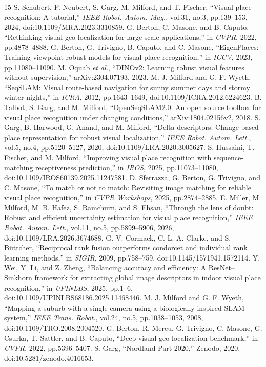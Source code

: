 \documentclass[conference]{IEEEtran}
\begin{document}
\begin{thebibliography}{15}
 S. Schubert, P. Neubert, S. Garg, M. Milford, and T. Fischer, ``Visual place recognition: A tutorial,'' \emph{IEEE Robot. Autom. Mag.}, vol.31, no.3, pp.139--153, 2024, doi:10.1109/MRA.2023.3310859.
 G. Berton, C. Masone, and B. Caputo, ``Rethinking visual geo-localization for large-scale applications,'' in \emph{CVPR}, 2022, pp.4878--4888.
 G. Berton, G. Trivigno, B. Caputo, and C. Masone, ``EigenPlaces: Training viewpoint robust models for visual place recognition,'' in \emph{ICCV}, 2023, pp.11080--11090.
 M. Oquab \emph{et al.}, ``DINOv2: Learning robust visual features without supervision,'' arXiv:2304.07193, 2023.
 M. J. Milford and G. F. Wyeth, ``SeqSLAM: Visual route-based navigation for sunny summer days and stormy winter nights,'' in \emph{ICRA}, 2012, pp.1643--1649, doi:10.1109/ICRA.2012.6224623.
 B. Talbot, S. Garg, and M. Milford, ``OpenSeqSLAM2.0: An open source toolbox for visual place recognition under changing conditions,'' arXiv:1804.02156v2, 2018.
 S. Garg, B. Harwood, G. Anand, and M. Milford, ``Delta descriptors: Change-based place representation for robust visual localization,'' \emph{IEEE Robot. Autom. Lett.}, vol.5, no.4, pp.5120--5127, 2020, doi:10.1109/LRA.2020.3005627.
 S. Hussaini, T. Fischer, and M. Milford, ``Improving visual place recognition with sequence-matching receptiveness prediction,'' in \emph{IROS}, 2025, pp.11073--11080, doi:10.1109/IROS60139.2025.11247581.
 D. Sferrazza, G. Berton, G. Trivigno, and C. Masone, ``To match or not to match: Revisiting image matching for reliable visual place recognition,'' in \emph{CVPR Workshops}, 2025, pp.2874--2885.
 E. Miller, M. Milford, M. B. Hafez, S. Ramchurn, and S. Ehsan, ``Through the lens of doubt: Robust and efficient uncertainty estimation for visual place recognition,'' \emph{IEEE Robot. Autom. Lett.}, vol.11, no.5, pp.5899--5906, 2026, doi:10.1109/LRA.2026.3674688.
 G. V. Cormack, C. L. A. Clarke, and S. B\"uttcher, ``Reciprocal rank fusion outperforms condorcet and individual rank learning methods,'' in \emph{SIGIR}, 2009, pp.758--759, doi:10.1145/1571941.1572114.
 Y. Wei, Y. Li, and Z. Zheng, ``Balancing accuracy and efficiency: A ResNet--Sinkhorn framework for extracting global image descriptors in indoor visual place recognition,'' in \emph{UPINLBS}, 2025, pp.1--6, doi:10.1109/UPINLBS68186.2025.11468446.
 M. J. Milford and G. F. Wyeth, ``Mapping a suburb with a single camera using a biologically inspired SLAM system,'' \emph{IEEE Trans. Robot.}, vol.24, no.5, pp.1038--1053, 2008, doi:10.1109/TRO.2008.2004520.
 G. Berton, R. Mereu, G. Trivigno, C. Masone, G. Csurka, T. Sattler, and B. Caputo, ``Deep visual geo-localization benchmark,'' in \emph{CVPR}, 2022, pp.5396--5407.
 S. Garg, ``Nordland-Part-2020,'' Zenodo, 2020, doi:10.5281/zenodo.4016653.

\end{thebibliography}
\end{document}
